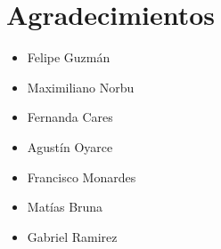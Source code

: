 \section{Agradecimientos}
\begin{multicols}{3}
    \begin{itemize}
        \item Felipe Guzmán

        \item Maximiliano Norbu

        \item Fernanda Cares

        \item Agustín Oyarce

        \item Francisco Monardes

        \item Matías Bruna

        \item Gabriel Ramirez
    \end{itemize}
\end{multicols}



